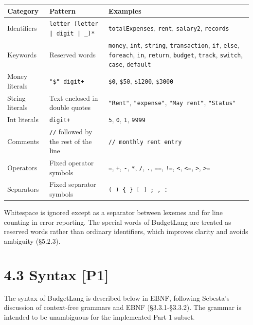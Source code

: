 \documentclass[11pt]{article}
\begin{document}
\begin{table}[h]
\small
\renewcommand{\arraystretch}{1.45}
\begin{tabularx}{\textwidth}{>{\raggedright\arraybackslash}p{} >{\raggedright\arraybackslash}p{} >{\raggedright\arraybackslash}X}
\toprule
\textbf{Category} & \textbf{Pattern} & \textbf{Examples} \\
\midrule
Identifiers & \mbox{\texttt{letter (letter | digit | \_)*}} & \texttt{totalExpenses}, \texttt{rent}, \texttt{salary2}, \texttt{records} \\
Keywords & Reserved words & \texttt{money}, \texttt{int}, \texttt{string}, \texttt{transaction}, \texttt{if}, \texttt{else}, \texttt{foreach}, \texttt{in}, \texttt{return}, \texttt{budget}, \texttt{track}, \texttt{switch}, \texttt{case}, \texttt{default} \\
Money literals & \texttt{"\$" digit+} & \texttt{\$0}, \texttt{\$50}, \texttt{\$1200}, \texttt{\$3000} \\
String literals & Text enclosed in double quotes & \texttt{"Rent"}, \texttt{"expense"}, \texttt{"May rent"}, \texttt{"Status"} \\
Int literals & \texttt{digit+} & \texttt{5}, \texttt{0}, \texttt{1}, \texttt{9999} \\
Comments & \texttt{//} followed by the rest of the line & \texttt{// monthly rent entry} \\
Operators & Fixed operator symbols & \texttt{=}, \texttt{+}, \texttt{-}, \texttt{*}, \texttt{/}, \texttt{.}, \texttt{==}, \texttt{!=}, \texttt{<}, \texttt{<=}, \texttt{>}, \texttt{>=} \\
Separators & Fixed separator symbols & \texttt{( ) \{ \} [ ] ; , :} \\
\bottomrule
\end{tabularx}
\end{table}

Whitespace is ignored except as a separator between lexemes and for line counting in error reporting. The special words of BudgetLang are treated as reserved words rather than ordinary identifiers, which improves clarity and avoids ambiguity (\S5.2.3).

\section*{4.3 Syntax [P1]}
The syntax of BudgetLang is described below in EBNF, following Sebesta's discussion of context-free grammars and EBNF (\S3.3.1-\S3.3.2). The grammar is intended to be unambiguous for the implemented Part 1 subset.
\end{document}
